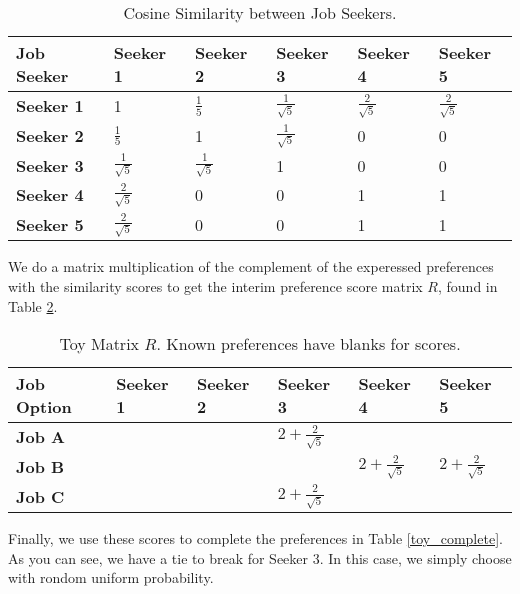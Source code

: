 \begin{table}[h!]
\begin{center}
\caption{Cosine Similarity between Job Seekers.}
\label{toy_similarity}
\begin{tabular}{l|l|l|l|l|l}
\hline 
\textbf{Job Seeker} & \textbf{Seeker 1} &  \textbf{Seeker 2} & \textbf{Seeker 3} &\textbf{Seeker 4} &\textbf{Seeker 5} \\
\hline
\textbf{Seeker 1} & 1 & $\frac{1}{5}$ & $\frac{1}{\sqrt{5}}$ & $\frac{2}{\sqrt{5}}$ & $\frac{2}{\sqrt{5}}$\\
\textbf{Seeker 2} & $\frac{1}{5}$ & 1 & $\frac{1}{\sqrt{5}}$ & 0 & 0 \\
\textbf{Seeker 3} &  $\frac{1}{\sqrt{5}}$ & $\frac{1}{\sqrt{5}}$ & 1 & 0 & 0 \\
\textbf{Seeker 4} & $\frac{2}{\sqrt{5}}$ & 0  & 0 & 1 & 1 \\
\textbf{Seeker 5} & $\frac{2}{\sqrt{5}}$ & 0  & 0 & 1 & 1\\
\hline 
\end{tabular}
\end{center}
\end{table}

We do a matrix multiplication of the complement of the experessed preferences with the similarity scores to get the interim preference score matrix $R$, found in Table \ref{toy_scores}.

\begin{table}[h!]
\begin{center}
\caption{Toy Matrix $R$. Known preferences have blanks for scores.}
\label{toy_scores}
\begin{tabular}{l|l|l|l|l|l}
\hline 
\textbf{Job Option} & \textbf{Seeker 1} &  \textbf{Seeker 2} & \textbf{Seeker 3} &\textbf{Seeker 4} &\textbf{Seeker 5} \\
\hline
\textbf{Job A} &  &  & $2 + \frac{2}{\sqrt{5}}$ &  & \\
\textbf{Job B} &  &  &  &$2 + \frac{2}{\sqrt{5}}$ &$2 + \frac{2}{\sqrt{5}}$\\
\textbf{Job C} &  &  & $2 + \frac{2}{\sqrt{5}}$ & &\\
\hline 
\end{tabular}
\end{center}
\end{table}

Finally, we use these scores to complete the preferences in Table \ref{toy_complete}. As you can see, we have a tie to break for Seeker 3. In this case, we simply choose with rondom uniform probability.

